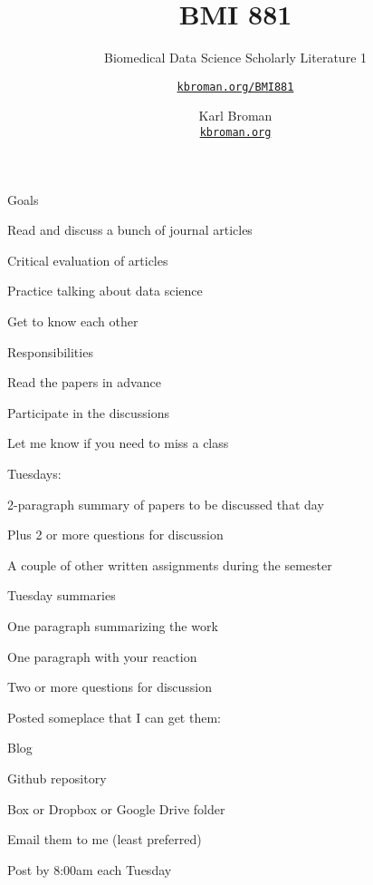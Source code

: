 \documentclass[aspectratio=169,12pt,t]{beamer}
\title{BMI 881}
\subtitle{Biomedical Data Science Scholarly Literature 1}
\author{\href{https://kbroman.org/BMI881}{\tt kbroman.org/BMI881} }
\institute{}
\date{\small \hspace{3in} Karl Broman \\
  \hspace{3in} \href{https://kbroman.org}{\color{foreground}
    \small \tt kbroman.org}}
\begin{document}
{
\frame{
  \titlepage
} }




\begin{frame}{Goals}

  \bbi
\item Read and discuss a bunch of journal articles
\item Critical evaluation of articles
\item Practice talking about data science
\item Get to know each other
  \ei

\end{frame}





\begin{frame}{Responsibilities}

  \bbi
\item Read the papers in advance
\item Participate in the discussions
\item Let me know if you need to miss a class
\item Tuesdays:
  \bi
  \item 2-paragraph summary of papers to be discussed that day
  \item Plus 2 or more questions for discussion
  \ei
\item A couple of other written assignments during the semester
  \ei

\end{frame}



\begin{frame}{Tuesday summaries}

  \bbi
\item One paragraph summarizing the work
\item One paragraph with your reaction
\item Two or more questions for discussion
\item Posted someplace that I can get them:
  \bi
\item Blog
\item Github repository
\item Box or Dropbox or Google Drive folder
\item Email them to me (least preferred)
  \ei
\item Post by 8:00am each Tuesday
\ei

\end{frame}
\end{document}
